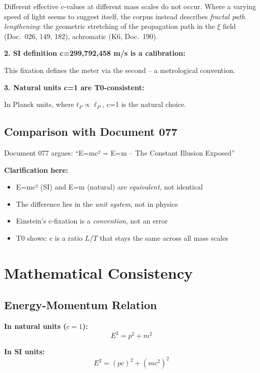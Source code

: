 	Different effective c-values at different mass scales do not occur. Where a varying speed of light seems to suggest itself, the corpus instead describes \emph{fractal path lengthening}: the geometric stretching of the propagation path in the $\xi$ field (Doc.~026, 149, 182), achromatic (K6, Doc.~190).
	
	\textbf{2. SI definition c=299,792,458 m/s is a calibration:}
	
	This fixation defines the meter via the second -- a metrological convention.
	
	\textbf{3. Natural units c=1 are T0-consistent:}
	
	In Planck units, where $t_P \propto \ell_P$, c=1 is the natural choice.
	
	\subsection{Comparison with Document 077}
	
	Document 077 argues: ``E=mc² = E=m -- The Constant Illusion Exposed''
	
	\textbf{Clarification here:}
	\begin{itemize}
		\item E=mc² (SI) and E=m (natural) are \emph{equivalent}, not identical
		\item The difference lies in the \emph{unit system}, not in physics
		\item Einstein's c-fixation is a \emph{convention}, not an error
		\item T0 shows: c is a ratio $L/T$ that stays the same across all mass scales
	\end{itemize}
	
	\section{Mathematical Consistency}
	
	\subsection{Energy-Momentum Relation}
	
	\textbf{In natural units ($c=1$):}
	\begin{equation}
		E^2 = p^2 + m^2
	\end{equation}
	
	\textbf{In SI units:}
	\begin{equation}
		E^2 = (pc)^2 + (mc^2)^2
	\end{equation}
	
